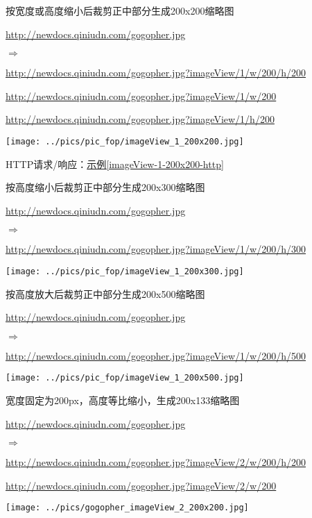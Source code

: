 \documentclass[11pt, oneside]{book}
\newcommand{\qsym}[1]{
\footnotesize
\noindent
#1\par
\normalsize
}
\newcommand{\qpara}[1]{
\vspace{0.3em}
\noindent
#1\par
\vspace{0.3em}
}
\newcommand{\qsamplelink}[1]{
\vspace{0.2em}
\noindent
#1\par
\vspace{0.1em}
}
\newcommand{\qurl}[1]{\footnotesize\url{#1}\normalsize}
\newcommand{\qsample}[1]{\hyperref[#1]{示例\ref*{#1}}}
\begin{document}
\begin{sample}
  \caption{按宽度或高度缩小后裁剪正中部分生成200x200缩略图}
    \qsamplelink{\qurl{http://newdocs.qiniudn.com/gogopher.jpg}}
    \qsym{$\Rightarrow$}
    \qsamplelink{\qurl{http://newdocs.qiniudn.com/gogopher.jpg?imageView/1/w/200/h/200}}
    \qsamplelink{\qurl{http://newdocs.qiniudn.com/gogopher.jpg?imageView/1/w/200}}
    \qsamplelink{\qurl{http://newdocs.qiniudn.com/gogopher.jpg?imageView/1/h/200}}

    \begin{center}
      \texttt{[image: ../pics/pic\_fop/imageView\_1\_200x200.jpg]}
    \end{center}

    \qpara{HTTP请求/响应：\qsample{imageView-1-200x200-http}}
  \label{imageView-1-200x200}
\end{sample}

\begin{sample}
  \caption{按高度缩小后裁剪正中部分生成200x300缩略图}
    \qsamplelink{\qurl{http://newdocs.qiniudn.com/gogopher.jpg}}
    \qsym{$\Rightarrow$}
    \qsamplelink{\qurl{http://newdocs.qiniudn.com/gogopher.jpg?imageView/1/w/200/h/300}}

    \begin{center}
      \texttt{[image: ../pics/pic\_fop/imageView\_1\_200x300.jpg]}
    \end{center}
  \label{imageView-1-200x300}
\end{sample}

\begin{sample}
  \caption{按高度放大后裁剪正中部分生成200x500缩略图}
    \qsamplelink{\qurl{http://newdocs.qiniudn.com/gogopher.jpg}}
    \qsym{$\Rightarrow$}
    \qsamplelink{\qurl{http://newdocs.qiniudn.com/gogopher.jpg?imageView/1/w/200/h/500}}

    \begin{center}
      \texttt{[image: ../pics/pic\_fop/imageView\_1\_200x500.jpg]}
    \end{center}
  \label{imageView-1-200x500}
\end{sample}

\begin{sample}
  \caption{宽度固定为200px，高度等比缩小，生成200x133缩略图}
    \qsamplelink{\qurl{http://newdocs.qiniudn.com/gogopher.jpg}}
    \qsym{$\Rightarrow$}
    \qsamplelink{\qurl{http://newdocs.qiniudn.com/gogopher.jpg?imageView/2/w/200/h/200}}
    \qsamplelink{\qurl{http://newdocs.qiniudn.com/gogopher.jpg?imageView/2/w/200}}

    \begin{center}
      \texttt{[image: ../pics/gogopher\_imageView\_2\_200x200.jpg]}
    \end{center}
  \label{imageView-2-200x200}
\end{sample}
\end{document}
